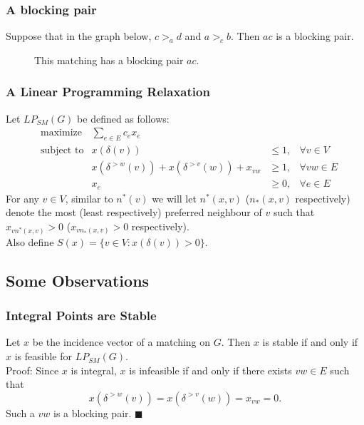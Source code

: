 \documentclass{beamer}
\begin{document}
\begin{frame}
\frametitle{A blocking pair}
Suppose that in the graph below, $c >_a d$ and $a >_c b$. Then $ac$ is a blocking pair.
\begin{figure}
\centering
{}
\caption{This matching has a blocking pair $ac$.}
\end{figure}
\end{frame}

\begin{frame}
\frametitle{A Linear Programming Relaxation}
Let $LP_{SM}(G)$ be defined as follows:
\begin{align*}
&\text{maximize} &\sum_{e \in E} c_e x_e \\
&\text{subject to} &x(\delta(v)) &\leq 1, &\forall v \in V\\
& &x(\delta^{>w}(v)) + x(\delta^{>v}(w)) + x_{vw} &\geq 1, &\forall vw \in E\\
& &x_e &\geq 0, &\forall e \in E
\end{align*}
For any $v \in V$, similar to $n^*(v)$ we will let $n^*(x,v)$ ($n_*(x,v)$ respectively) denote the most (least respectively) preferred neighbour of $v$ such that $x_{vn^*(x,v)} > 0$ ($x_{vn_*(x,v)} > 0$ respectively). \\
Also define $S(x) = \{ v \in V : x(\delta(v)) > 0 \}$.
\end{frame}

\subsection{Some Observations}
\begin{frame}
\frametitle{Integral Points are Stable}
Let $x$ be the incidence vector of a matching on $G$. Then $x$ is stable if and only if $x$ is feasible for $LP_{SM}(G)$.\\
Proof: Since $x$ is integral, $x$ is infeasible if and only if there exists $vw \in E$ such that $$ x(\delta^{>w}(v)) = x(\delta^{>v}(w)) = x_{vw} = 0. $$
Such a $vw$ is a blocking pair. $\blacksquare$
\end{frame}
\end{document}
